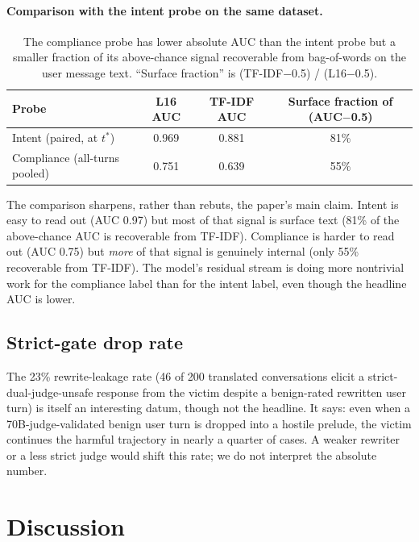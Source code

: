\documentclass[11pt]{article}
\begin{document}
\paragraph{Comparison with the intent probe on the same dataset.}
\begin{table}[h]
\centering
\begin{tabular}{lccc}
\toprule
\textbf{Probe} & \textbf{L16 AUC} & \textbf{TF-IDF AUC} & \textbf{Surface fraction of (AUC$-$0.5)} \\
\midrule
Intent (paired, at $t^*$)              & 0.969 & 0.881 & 81\% \\
Compliance (all-turns pooled)          & 0.751 & 0.639 & 55\% \\
\bottomrule
\end{tabular}
\caption{The compliance probe has lower absolute AUC than the intent probe but a smaller fraction of its above-chance signal recoverable from bag-of-words on the user message text. ``Surface fraction'' is (TF-IDF$-$0.5) / (L16$-$0.5).}
\label{tab:intent_vs_compliance}
\end{table}

The comparison sharpens, rather than rebuts, the paper's main claim.
Intent is easy to read out (AUC 0.97) but most of that signal is surface text (81\% of the above-chance AUC is recoverable from TF-IDF).
Compliance is harder to read out (AUC 0.75) but \emph{more} of that signal is genuinely internal (only 55\% recoverable from TF-IDF).
The model's residual stream is doing more nontrivial work for the compliance label than for the intent label, even though the headline AUC is lower.

\subsection{Strict-gate drop rate}

The 23\% rewrite-leakage rate (46 of 200 translated conversations elicit a strict-dual-judge-unsafe response from the victim despite a benign-rated rewritten user turn) is itself an interesting datum, though not the headline.
It says: even when a 70B-judge-validated benign user turn is dropped into a hostile prelude, the victim continues the harmful trajectory in nearly a quarter of cases.
A weaker rewriter or a less strict judge would shift this rate; we do not interpret the absolute number.

\section{Discussion}
\label{sec:discussion}
\end{document}
